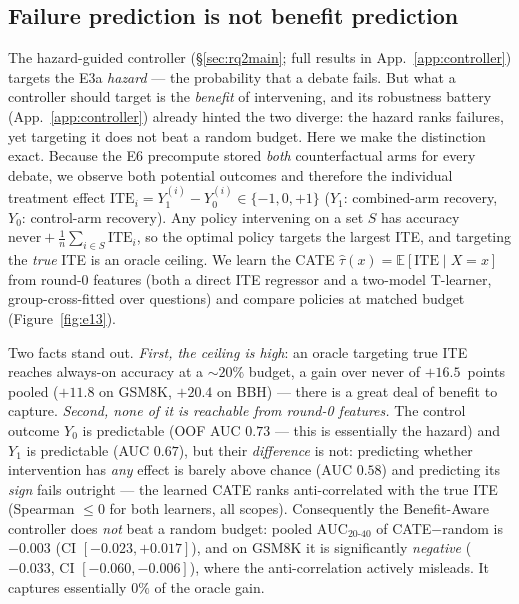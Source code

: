 
\subsection{Failure prediction is not benefit prediction}
\label{sec:rq13}

The hazard-guided controller (\S\ref{sec:rq2main}; full results in App.~\ref{app:controller}) targets
the E3a \emph{hazard} --- the probability that a debate fails. But what a controller should target is
the \emph{benefit} of intervening, and its robustness battery (App.~\ref{app:controller}) already
hinted the two diverge: the hazard ranks failures, yet targeting it does not beat a random budget. Here we make the distinction
exact. Because the E6 precompute stored \emph{both} counterfactual arms for every debate,
we observe both potential outcomes and therefore the individual treatment effect
$\mathrm{ITE}_i = Y_1^{(i)}-Y_0^{(i)}\in\{-1,0,+1\}$ ($Y_1$: combined-arm recovery, $Y_0$:
control-arm recovery). Any policy intervening on a set $S$ has accuracy
$\mathrm{never}+\tfrac{1}{n}\sum_{i\in S}\mathrm{ITE}_i$, so the optimal policy targets the
largest ITE, and targeting the \emph{true} ITE is an oracle ceiling. We learn the CATE
$\hat\tau(x)=\mathbb{E}[\mathrm{ITE}\mid X{=}x]$ from round-0 features (both a direct ITE
regressor and a two-model T-learner, group-cross-fitted over questions) and compare
policies at matched budget (Figure~\ref{fig:e13}).

Two facts stand out. \emph{First, the ceiling is high}: an oracle targeting true ITE reaches
always-on accuracy at a $\sim\!20\%$ budget, a gain over never of $+16.5$~points pooled
($+11.8$ on GSM8K, $+20.4$ on BBH) --- there is a great deal of benefit to capture.
\emph{Second, none of it is reachable from round-0 features.} The control outcome $Y_0$ is
predictable (OOF AUC $0.73$ --- this is essentially the hazard) and $Y_1$ is predictable
(AUC $0.67$), but their \emph{difference} is not: predicting whether intervention has
\emph{any} effect is barely above chance (AUC $0.58$) and predicting its \emph{sign} fails
outright --- the learned CATE ranks anti-correlated with the true ITE (Spearman $\le 0$ for
both learners, all scopes). Consequently the Benefit-Aware controller does \emph{not} beat a
random budget: pooled $\mathrm{AUC}_{20\text{-}40}$ of CATE$-$random is $-0.003$
(CI $[-0.023,+0.017]$), and on GSM8K it is significantly \emph{negative} ($-0.033$,
CI $[-0.060,-0.006]$), where the anti-correlation actively misleads. It captures
essentially $0\%$ of the oracle gain.

